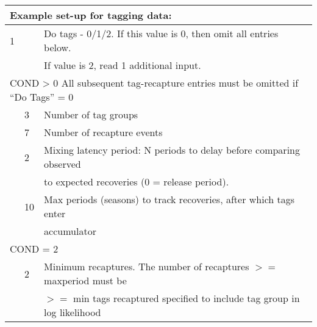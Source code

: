 \begin{center}
	\begin{longtable}{p{1.1cm} p{1.1cm} p{1.1cm} p{1.1cm} p{1.1cm} p{1.1cm} p{1.1cm} p{1.1cm} p{3cm}}
		\multicolumn{9}{l}{Example set-up for tagging data:} \\
		\hline
		1 & & \multicolumn{7}{l}{Do tags - 0/1/2. If this value is 0, then omit all entries below.} \\
		&   & \multicolumn{7}{l}{If value is 2, read 1 additional input.} \Tstrut\Bstrut\\
		\hline
		\multicolumn{9}{l}{COND > 0 All subsequent tag-recapture entries must be omitted if ``Do Tags'' = 0}
		 \Tstrut\\

		 & 3 & \multicolumn{7}{l}{Number of tag groups} \Bstrut\\
		 \hline
		 & 7 & \multicolumn{7}{l}{Number of recapture events} \Tstrut\Bstrut\\
		 \hline
		 & 2 & \multicolumn{7}{l}{Mixing latency period: N periods to delay before comparing observed} \Tstrut\\
		 &   &  \multicolumn{7}{l}{to expected recoveries (0 = release period).} \Bstrut\\
		 \hline
		 & 10 & \multicolumn{7}{l}{Max periods (seasons) to track recoveries, after which tags enter} \Tstrut\\
		 &    & \multicolumn{7}{l}{accumulator} \Bstrut\\
		 \hline
		 \multicolumn{9}{l}{COND = 2} \Tstrut\\
		 &  2 &  \multicolumn{7}{l}{Minimum recaptures. The number of recaptures $>=$ maxperiod must be} \\
		 &    &  \multicolumn{7}{l}{$>=$ min tags recaptured specified to include tag group in log likelihood}\Bstrut\\
		 

\end{longtable}
\end{center}
